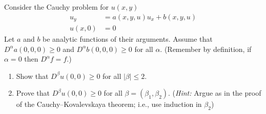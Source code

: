 \begin{problem}
  Consider the Cauchy problem for \(u(x,y)\)
  \begin{align*}
    u_y&=a(x, y, u)u_x+b(x,y,u)\\
    u(x,0)&=0
  \end{align*}
  Let \(a\) and \(b\) be analytic functions of their arguments. Assume that
  \(D^\alpha a(0,0,0)\geq 0\) and \(D^\alpha b(0,0,0)\geq 0\) for all
  \(\alpha\). (Remember by definition, if \(\alpha=0\) then
  \(D^\alpha f=f\).)
  \begin{enumerate}[label=(\alph*),noitemsep]
  \item Show that \(D^\beta u(0,0)\geq 0\) for all \(|\beta|\leq 2\).
  \item Prove that \(D^\beta u(0,0)\geq 0\) for all
    \(\beta=(\beta_1,\beta_2)\). (\emph{Hint:} Argue as in the proof of the
    Cauchy--Kovalevskaya theorem; i.e., use induction in \(\beta_2\))
  \end{enumerate}
\end{problem}
